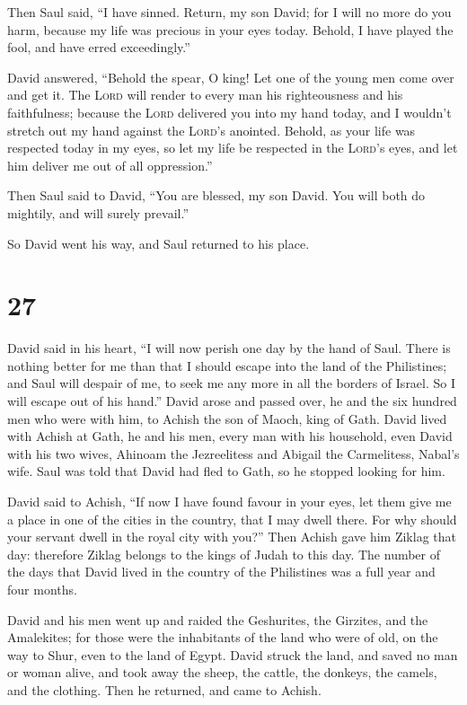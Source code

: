  Then Saul said, ``I have sinned. Return, my son David;
for I will no more do you harm, because my life was precious in your
eyes today. Behold, I have played the fool, and have erred
exceedingly.''

 David answered, ``Behold the spear, O king! Let one of
the young men come over and get it.  The \textsc{Lord}
will render to every man his righteousness and his faithfulness; because
the \textsc{Lord} delivered you into my hand today, and I wouldn't
stretch out my hand against the \textsc{Lord}'s anointed.
 Behold, as your life was respected today in my eyes, so
let my life be respected in the \textsc{Lord}'s eyes, and let him
deliver me out of all oppression.''

 Then Saul said to David, ``You are blessed, my son
David. You will both do mightily, and will surely prevail.''

So David went his way, and Saul returned to his place.

\hypertarget{section-26}{%
\section{27}\label{section-26}}

 David said in his heart, ``I will now perish one day by
the hand of Saul. There is nothing better for me than that I should
escape into the land of the Philistines; and Saul will despair of me, to
seek me any more in all the borders of Israel. So I will escape out of
his hand.''  David arose and passed over, he and the six
hundred men who were with him, to Achish the son of Maoch, king of Gath.
 David lived with Achish at Gath, he and his men, every
man with his household, even David with his two wives, Ahinoam the
Jezreelitess and Abigail the Carmelitess, Nabal's wife. 
Saul was told that David had fled to Gath, so he stopped looking for
him.

 David said to Achish, ``If now I have found favour in
your eyes, let them give me a place in one of the cities in the country,
that I may dwell there. For why should your servant dwell in the royal
city with you?''  Then Achish gave him Ziklag that day:
therefore Ziklag belongs to the kings of Judah to this day.
 The number of the days that David lived in the country of
the Philistines was a full year and four months.

 David and his men went up and raided the Geshurites, the
Girzites, and the Amalekites; for those were the inhabitants of the land
who were of old, on the way to Shur, even to the land of Egypt.
 David struck the land, and saved no man or woman alive,
and took away the sheep, the cattle, the donkeys, the camels, and the
clothing. Then he returned, and came to Achish.

